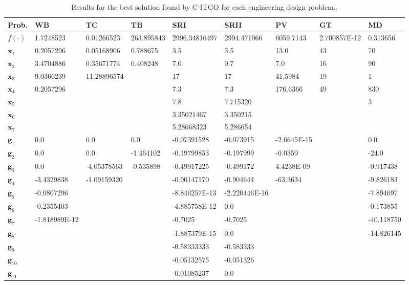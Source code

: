 
\noindent
\begin{table*}[tp]
    \tiny
\begin{center}
\begin{adjustwidth}{-1cm}{}
\begin{tabular}{ | P{1.0cm} | P{1.5cm} |  P{1.5cm} | P{1.5cm} | P{1.5cm} | P{1.5cm} | P{1.5cm} | P{1.5cm} | P{1.5cm} |  }
\hline
\textbf{Prob.} & \textbf{WB} & \textbf{TC} & \textbf{TB} & \textbf{SRI} & \textbf{SRII} & \textbf{PV} & \textbf{GT} & \textbf{MD} \\
\hline
\rule{0pt}{3ex}
$f(\cdot)$ & 1.7248523 & 0.01266523 & 263.895843 & 2996.34816497 & 2994.471066 & 6059.7143 & 2.700857E-12 & 0.313656 \\
\hline
\rule{0pt}{3ex}
$\bm{x}_1$ &  0.2057296 & 0.05168906 & 0.788675 & 3.5 & 3.5 & 13.0 & 43 & 70  \\
$\bm{x}_2$ &  3.4704886 & 0.35671774 & 0.408248 & 7.0 & 0.7 & 7.0 & 16 & 90 \\
$\bm{x}_3$ &  9.0366239 & 11.28896574 & & 17 & 17 & 41.5984 & 19 &  1  \\
$\bm{x}_4$ &  0.2057296 & & & 7.3 & 7.3 & 176.6366 & 49 & 830  \\
$\bm{x}_5$ & & & & 7.8 & 7.715320 & & & 3 \\
$\bm{x}_6$ & & & & 3.35021467 & 3.350215 & & &   \\
$\bm{x}_7$ & & & & 5.28668323 & 5.286654 & & &   \\
\hline
\rule{0pt}{3ex}
$\bm{g}_1$ & 0.0 & 0.0 & 0.0 & -0.07391528 & -0.073915 & -2.6645E-15 & & 0.0  \\
$\bm{g}_2$ & 0.0 & 0.0 & -1.464102 & -0.19799853 & -0.197999 & -0.0359 & & -24.0  \\
$\bm{g}_3$ & 0.0 & -4.05378563 & -0.535898 & -0.49917225 & -0.499172 & 4.4238E-09 & & -0.917438 \\
$\bm{g}_4$ & -3.4329838 & -1.09159320 & & -0.90147170 & -0.904644 & -63.3634 & & -9.826183  \\
$\bm{g}_5$ & -0.0807296 & & & -8.846257E-13 & -2.220446E-16 & & &  -7.894697 \\
$\bm{g}_6$ & -0.2355403 & & & -4.885758E-12 & 0.0 & & & -0.173855  \\
$\bm{g}_7$ & -1.818989E-12 & & & -0.7025 & -0.7025 & & & -40.118750 \\
$\bm{g}_8$ & & & & -1.887379E-15 & 0.0 & & &  -14.826145 \\
$\bm{g}_9$ & & & & -0.58333333 & -0.583333 & & &    \\
$\bm{g}_{10}$ & & & & -0.05132575 & -0.051326 & & &    \\
$\bm{g}_{11}$ & & & & -0.01085237 & 0.0 & & &    \\
\hline
\end{tabular}
\end{adjustwidth}
\end{center}
\vspace*{-6mm}
\caption{ Results for the best solution found by C-ITGO for each engineering design problem.. \\[1em]}
\label{tab:BestResults}
\end{table*}

